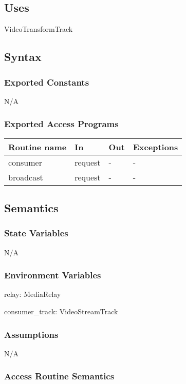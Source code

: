 \documentclass[12pt, titlepage]{article}
\begin{document}
\subsection{Uses}
VideoTransformTrack

\subsection{Syntax}

\subsubsection{Exported Constants}
N/A

\subsubsection{Exported Access Programs}
\begin{table}[h!]
  \centering
  \begin{tabular}{llll}
    \hline
    \textbf{Routine name} & \textbf{In}   & \textbf{Out} & \textbf{Exceptions} \\
    \hline
    consumer        & request & -      & -             \\
    broadcast       & request & -      & -             \\
    \hline
  \end{tabular}
\end{table}

\subsection{Semantics}

\subsubsection{State Variables}
N/A

\subsubsection{Environment Variables}
relay: MediaRelay

consumer\_track: VideoStreamTrack

\subsubsection{Assumptions}
N/A

\subsubsection{Access Routine Semantics}
\end{document}

